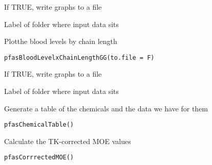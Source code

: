 \documentclass[a4paper]{book}
\begin{document}
%
\begin{Arguments}
\begin{ldescription}
\item[\code{to.file}] If TRUE, write graphs to a file

\item[\code{data.version}] Label of folder where input data sits
\end{ldescription}
\end{Arguments}
%
\begin{Description}\relax
Plotthe blood levels by chain length
\end{Description}
%
\begin{Usage}
\begin{verbatim}
pfasBloodLevelxChainLengthGG(to.file = F)
\end{verbatim}
\end{Usage}
%
\begin{Arguments}
\begin{ldescription}
\item[\code{to.file}] If TRUE, write graphs to a file

\item[\code{data.version}] Label of folder where input data sits
\end{ldescription}
\end{Arguments}
%
\begin{Description}\relax
Generate a table of the chemicals and the data we have for them
\end{Description}
%
\begin{Usage}
\begin{verbatim}
pfasChemicalTable()
\end{verbatim}
\end{Usage}
%
\begin{Description}\relax
Calculate the TK-corrected MOE values
\end{Description}
%
\begin{Usage}
\begin{verbatim}
pfasCorrrectedMOE()
\end{verbatim}
\end{Usage}
\end{document}
